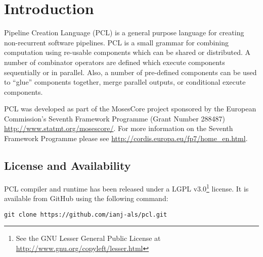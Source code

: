\chapter{Introduction}
Pipeline Creation Language (PCL) is a general purpose language for creating non-recurrent software pipelines. PCL is a small grammar for combining computation using re-usable components which can be shared or distributed. A number of combinator operators are defined which execute components sequentially or in parallel. Also, a number of pre-defined components can be used to ``glue'' components together, merge parallel outputs, or conditional execute components.

PCL was developed as part of the MosesCore project sponsored by the European Commission's Seventh Framework Programme (Grant Number 288487) \url{http://www.statmt.org/mosescore/}. For more information on the Seventh Framework Programme please see \url{http://cordis.europa.eu/fp7/home_en.html}.

\section{License and Availability}
PCL compiler and runtime has been released under a LGPL v3.0\footnote{See the GNU Lesser General Public License at \url{http://www.gnu.org/copyleft/lesser.html}} license. It is available from GitHub using the following command:
\begin{verbatim}
git clone https://github.com/ianj-als/pcl.git
\end{verbatim}
